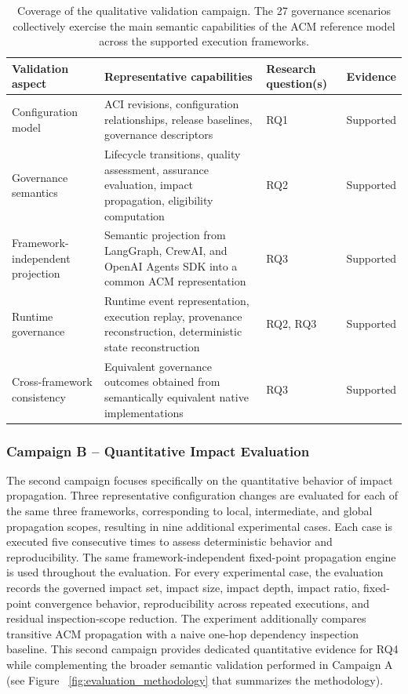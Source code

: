 \documentclass[10pt]{article}
\begin{document}
\begin{table}[t]
	\caption{Coverage of the qualitative validation campaign. The 27 governance scenarios collectively exercise the main semantic capabilities of the ACM reference model across the supported execution frameworks.}
	\label{tab:qualitative_validation}
	\centering
	\footnotesize
	\begin{tabular}{p{3.2cm}p{4.5cm}p{1.8cm}c}
		\toprule
		\textbf{Validation aspect} &
		\textbf{Representative capabilities} &
		\textbf{Research question(s)} &
		\textbf{Evidence} \\
		\midrule
		
		Configuration model
		&
		ACI revisions, configuration relationships, release baselines, governance descriptors
		&
		RQ1
		&
		Supported
		\\
		
		Governance semantics
		&
		Lifecycle transitions, quality assessment, assurance evaluation, impact propagation, eligibility computation
		&
		RQ2
		&
		Supported
		\\
		
		Framework-independent projection
		&
		Semantic projection from LangGraph, CrewAI, and OpenAI Agents SDK into a common ACM representation
		&
		RQ3
		&
		Supported
		\\
		
		Runtime governance
		&
		Runtime event representation, execution replay, provenance reconstruction, deterministic state reconstruction
		&
		RQ2, RQ3
		&
		Supported
		\\
		
		Cross-framework consistency
		&
		Equivalent governance outcomes obtained from semantically equivalent native implementations
		&
		RQ3
		&
		Supported
		\\
		
		\bottomrule
	\end{tabular}
\end{table}

\subsubsection{Campaign B -- Quantitative Impact Evaluation} The second campaign focuses specifically on the quantitative behavior of impact propagation. Three representative configuration changes are evaluated for each of the same three frameworks, corresponding to local, intermediate, and global propagation scopes, resulting in nine additional experimental cases. Each case is executed five consecutive times to assess deterministic behavior and reproducibility. The same framework-independent fixed-point propagation engine is used throughout the evaluation. For every experimental case, the evaluation records the governed impact set, impact size, impact depth, impact ratio, fixed-point convergence behavior, reproducibility across repeated executions, and residual inspection-scope reduction. The experiment additionally compares transitive ACM propagation with a naive one-hop dependency inspection baseline. This second campaign provides dedicated quantitative evidence for RQ4 while complementing the broader semantic validation performed in Campaign A  (see Figure ~\ref{fig:evaluation_methodology} that summarizes the methodology). 
\end{document}
